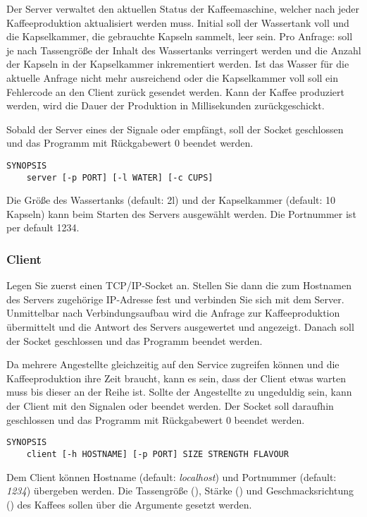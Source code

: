 Der Server verwaltet den aktuellen Status der Kaffeemaschine, welcher nach
jeder Kaffeeproduktion aktualisiert werden muss. Initial soll der Wassertank
voll und die Kapselkammer, die gebrauchte Kapseln sammelt, leer sein. Pro
Anfrage: soll je nach Tassengröße der Inhalt des Wassertanks verringert werden
und die Anzahl der Kapseln in der Kapselkammer inkrementiert werden. Ist das
Wasser für die aktuelle Anfrage nicht mehr ausreichend oder die Kapselkammer
voll soll ein Fehlercode an den Client zurück gesendet werden. Kann der Kaffee
produziert werden, wird die Dauer der Produktion in Millisekunden
zurückgeschickt.

Sobald der Server eines der Signale  oder
 empfängt, soll der Socket geschlossen und das
Programm mit Rückgabewert 0 beendet werden.

\begin{verbatim}
SYNOPSIS
    server [-p PORT] [-l WATER] [-c CUPS]
\end{verbatim}

Die Größe des Wassertanks (default: 2l) und der Kapselkammer (default: 10
Kapseln) kann beim Starten des Servers ausgewählt werden. Die Portnummer ist
per default 1234.

\subsubsection*{Client}
Legen Sie zuerst einen TCP/IP-Socket an. Stellen Sie dann die zum Hostnamen des
Servers zugehörige IP-Adresse fest und verbinden Sie sich mit dem
Server. Unmittelbar nach Verbindungsaufbau wird die Anfrage zur
Kaffeeproduktion übermittelt und die Antwort des Servers ausgewertet und
angezeigt. Danach soll der Socket geschlossen und das Programm beendet werden.

Da mehrere Angestellte gleichzeitig auf den Service zugreifen können und die
Kaffeeproduktion ihre Zeit braucht, kann es sein, dass der Client etwas warten
muss bis dieser an der Reihe ist. Sollte der Angestellte zu ungeduldig sein,
kann der Client mit den Signalen  oder 
beendet werden. Der Socket soll daraufhin geschlossen und das Programm mit
Rückgabewert 0 beendet werden.

\begin{verbatim}
SYNOPSIS
    client [-h HOSTNAME] [-p PORT] SIZE STRENGTH FLAVOUR
\end{verbatim}

Dem Client können Hostname (default: \emph{localhost}) und Portnummer (default:
\emph{1234}) übergeben werden. Die Tassengröße (), Stärke
() und Geschmacksrichtung () des Kaffees
sollen über die Argumente gesetzt werden.


